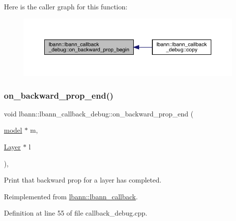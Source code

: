 Here is the caller graph for this function\+:\nopagebreak
\begin{figure}[H]
\begin{center}
\leavevmode
\includegraphics[width=350pt]{classlbann_1_1lbann__callback__debug_adaf60c995d2638a40d9c87a923c53865_icgraph}
\end{center}
\end{figure}
\mbox{\label{classlbann_1_1lbann__callback__debug_a19a8ec63f55fc86024c9ab8fe0836500}} 
\subsubsection{\texorpdfstring{on\+\_\+backward\+\_\+prop\+\_\+end()}{on\_backward\_prop\_end()}}
{\footnotesize\ttfamily void lbann\+::lbann\+\_\+callback\+\_\+debug\+::on\+\_\+backward\+\_\+prop\+\_\+end (\begin{DoxyParamCaption}\item[{\hyperlink{classlbann_1_1model}{model} $\ast$}]{m,  }\item[{\hyperlink{classlbann_1_1Layer}{Layer} $\ast$}]{l }\end{DoxyParamCaption})\hspace{0.3cm}{\ttfamily [override]}, {\ttfamily [virtual]}}

Print that backward prop for a layer has completed. 

Reimplemented from \hyperlink{classlbann_1_1lbann__callback_aba03b59c056ace8094095c08e39b9ac4}{lbann\+::lbann\+\_\+callback}.



Definition at line 55 of file callback\+\_\+debug.\+cpp.


